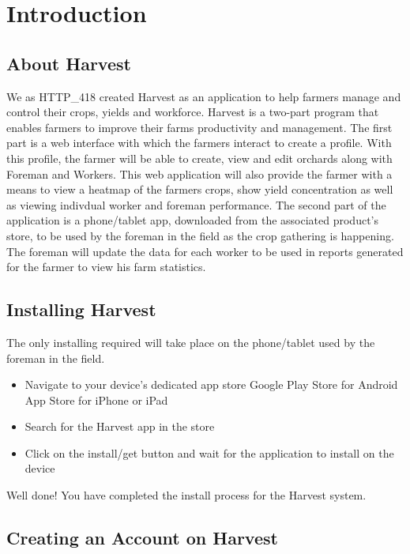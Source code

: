 \documentclass[11pt,fleqn]{book} %
\begin{document}

\chapter{Introduction}
	\section{About Harvest}
		We as HTTP_418 created Harvest as an application to help farmers manage and control their crops, yields and workforce. Harvest is a two-part program that enables farmers to improve their farms productivity and management. The first part is a web interface with which the farmers interact to create a profile. With this profile, the farmer will be able to create, view and edit orchards along with Foreman and Workers. This web application will also provide the farmer with a means to view a heatmap of the farmers crops, show yield concentration as well as viewing indivdual worker and foreman performance. The second part of the application is a phone/tablet app, downloaded from the associated product's store, to be used by the foreman in the field as the crop gathering is happening. The foreman will update the data for each worker to be used in reports generated for the farmer to view his farm statistics.
	\section{Installing Harvest}
		The only installing required will take place on the phone/tablet used by the foreman in the field.
		\begin{itemize}
			\item Navigate to your device's dedicated app store
				\subitem Google Play Store for Android
				\subitem App Store for iPhone or iPad
			\item Search for the Harvest app in the store
			\item Click on the install/get button and wait for the application to install on the device
		\end{itemize}
		Well done! You have completed the install process for the Harvest system.
	\section{Creating an Account on Harvest}

\end{document}
